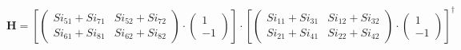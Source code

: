 \[ \mathbf{H} = \left[ \left(\begin{smallmatrix} Si_{51} + Si_{71} &
Si_{52} + Si_{72} \\ Si_{61} + Si_{81} & Si_{62} + Si_{82}
\end{smallmatrix}\right)\cdot \left(\begin{smallmatrix} 1 \\ -1
\end{smallmatrix}\right)\right]\cdot\left[ \left(\begin{smallmatrix}
Si_{11} + Si_{31} & Si_{12} + Si_{32} \\ Si_{21} + Si_{41} & Si_{22} +
Si_{42} \end{smallmatrix}\right)\cdot \left(\begin{smallmatrix} 1 \\
-1 \end{smallmatrix}\right)\right]^\dagger \]
